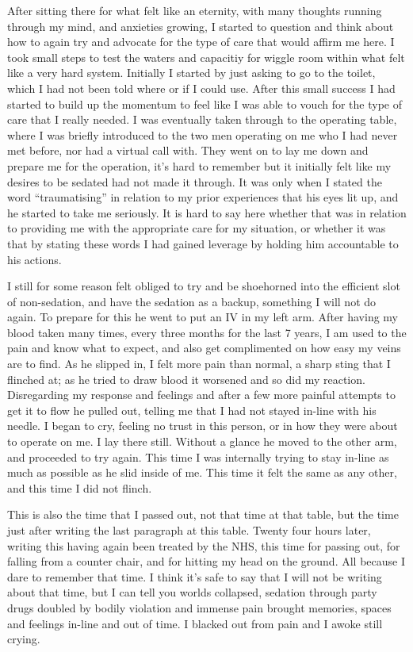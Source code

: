 After sitting there for what felt like an eternity, with many thoughts
running through my mind, and anxieties growing, I started to question
and think about how to again try and advocate for the type of care that
would affirm me here. I took small steps to test the waters and
capacitiy for wiggle room within what felt like a very hard system.
Initially I started by just asking to go to the toilet, which I had not
been told where or if I could use. After this small success I had
started to build up the momentum to feel like I was able to vouch for
the type of care that I really needed. I was eventually taken through to
the operating table, where I was briefly introduced to the two men
operating on me who I had never met before, nor had a virtual call with.
They went on to lay me down and prepare me for the operation, it's hard
to remember but it initially felt like my desires to be sedated had not
made it through. It was only when I stated the word ``traumatising'' in
relation to my prior experiences that his eyes lit up, and he started to
take me seriously. It is hard to say here whether that was in relation
to providing me with the appropriate care for my situation, or whether
it was that by stating these words I had gained leverage by holding him
accountable to his actions.

I still for some reason felt obliged to try and be shoehorned into the
efficient slot of non-sedation, and have the sedation as a backup,
something I will not do again. To prepare for this he went to put an IV
in my left arm. After having my blood taken many times, every three
months for the last 7 years, I am used to the pain and know what to
expect, and also get complimented on how easy my veins are to find. As
he slipped in, I felt more pain than normal, a sharp sting that I
flinched at; as he tried to draw blood it worsened and so did my
reaction. Disregarding my response and feelings and after a few more
painful attempts to get it to flow he pulled out, telling me that I had
not stayed in-line with his needle. I began to cry, feeling no trust in
this person, or in how they were about to operate on me. I lay there
still. Without a glance he moved to the other arm, and proceeded to try
again. This time I was internally trying to stay in-line as much as
possible as he slid inside of me. This time it felt the same as any
other, and this time I did not flinch.

This is also the time that I passed out, not that time at that table,
but the time just after writing the last paragraph at this table. Twenty
four hours later, writing this having again been treated by the NHS,
this time for passing out, for falling from a counter chair, and for
hitting my head on the ground. All because I dare to remember that time.
I think it's safe to say that I will not be writing about that time, but
I can tell you worlds collapsed, sedation through party drugs doubled by
bodily violation and immense pain brought memories, spaces and feelings
in-line and out of time. I blacked out from pain and I awoke still
crying.


